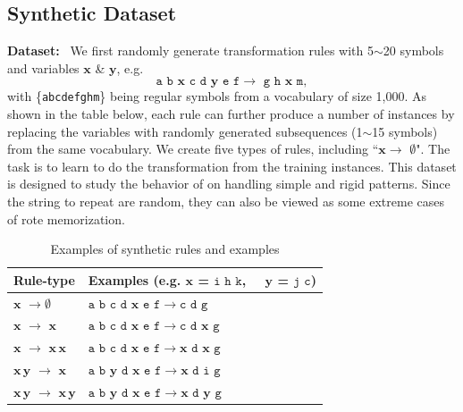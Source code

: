 \subsection{Synthetic Dataset}
\label{cp3.sec.synthetic}
\textbf{Dataset:}~  
We first randomly generate transformation rules with 5$\sim$20 symbols and variables $\mathbf{x}$ \& $\mathbf{y}$, e.g.   
\[
\texttt{a b } \mathbf{x} \texttt{ c d }\mathbf{y} \texttt{ e f} \longrightarrow \texttt{ g h }\mathbf{x}\texttt{ m},  
\]
with \{\texttt{a\;b\;c\;d\;e\;f\;g\;h\;m}\} being regular symbols from a vocabulary of size 1,000. As shown in the table below, each rule can further produce a number of instances by replacing the variables with randomly generated subsequences (1$\sim$15 symbols) from the same vocabulary. We create five types of rules, including ``$\mathbf{x}\rightarrow$ $\emptyset$".
The task is to learn to do the \sts transformation from the training instances. 
This dataset is designed to study the behavior of \copynet on handling simple and rigid patterns. Since the string to repeat are random, they can also be viewed as some extreme cases of rote memorization.   
 \begin{table}[htpb] %
\centering
\begin{tabular}{l|l}
\toprule
 Rule-type& {Examples (e.g. $\mathbf{x}$ = $\texttt{i h k}$,~~ $\mathbf{y}$ = $\texttt{j c}$)} \\
\midrule
$\mathbf{x}$ $\rightarrow \emptyset$ 
& $\texttt{a b c d }\mathbf{x} \texttt{ e f} \rightarrow \texttt{c d g}$\\
\cmidrule{1-2}
$\mathbf{x}$ $\rightarrow$ $\mathbf{x}$ 
& $\texttt{a b c d }\mathbf{x} \texttt{ e f} \rightarrow \texttt{c d } \mathbf{x} \texttt{ g} $\\
$\mathbf{x}$ $\rightarrow$ $\mathbf{x\,x}$ 
& $\texttt{a b c d }\mathbf{x} \texttt{ e f} \rightarrow \mathbf{x}  \texttt{ d } \mathbf{x} \texttt{ g} $\\
$\mathbf{x\,y}$ $\rightarrow$ $\mathbf{x}$ 
& $\texttt{a b } \mathbf{y} \texttt{ d }\mathbf{x} \texttt{ e f} \rightarrow \mathbf{x}  \texttt{ d i g} $\\
$\mathbf{x\,y}$ $\rightarrow$ $\mathbf{x\,y}$ 
& $\texttt{a b } \mathbf{y} \texttt{ d }\mathbf{x} \texttt{ e f} \rightarrow \mathbf{x}  \texttt{ d } \mathbf{y} \texttt{ g} $\\
\bottomrule
\end{tabular}
\caption{\label{cp3.table.syn_exp} Examples of synthetic rules and examples}
\end{table} 

